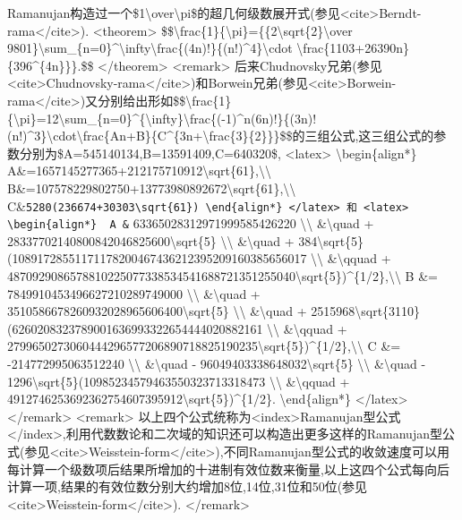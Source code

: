 \documentclass[
]{article}
\begin{document}
Ramanujan构造过一个\$1\textbackslash over\textbackslash pi\$的超几何级数展开式(参见\textless cite\textgreater Berndt-rama\textless/cite\textgreater).
\textless theorem\textgreater{}
\$\$\textbackslash frac\{1\}\{\textbackslash pi\}=\{\{2\textbackslash sqrt\{2\}\textbackslash over
9801\}\textbackslash sum\_\{n=0\}\^{}\textbackslash infty\textbackslash frac\{(4n)!\}\{(n!)\^{}4\}\textbackslash cdot
\textbackslash frac\{1103+26390n\}\{396\^{}\{4n\}\}\}.\$\$
\textless/theorem\textgreater{} \textless remark\textgreater{}
后来Chudnovsky兄弟(参见\textless cite\textgreater Chudnovsky-rama\textless/cite\textgreater)和Borwein兄弟(参见\textless cite\textgreater Borwein-rama\textless/cite\textgreater)又分别给出形如\$\$\textbackslash frac\{1\}\{\textbackslash pi\}=12\textbackslash sum\_\{n=0\}\^{}\{\textbackslash infty\}\textbackslash frac\{(-1)\^{}n(6n)!\}\{(3n)!(n!)\^{}3\}\textbackslash cdot\textbackslash frac\{An+B\}\{C\^{}\{3n+\textbackslash frac\{3\}\{2\}\}\}\$\$的三组公式,这三组公式的参数分别为\$A=545140134,B=13591409,C=640320\$,
\textless latex\textgreater{} \textbackslash begin\{align*\}
A\&=1657145277365+212175710912\textbackslash sqrt\{61\},\textbackslash\textbackslash{}
B\&=107578229802750+13773980892672\textbackslash sqrt\{61\},\textbackslash\textbackslash{}
C\&\texttt{5280(236674+30303\textbackslash{}sqrt\{61\})
\textbackslash{}end\{align*\}
\textless{}/latex\textgreater{}
和
\textless{}latex\textgreater{}
\textbackslash{}begin\{align*\}
\ A\ \&} 63365028312971999585426220 \textbackslash\textbackslash{}
\&\textbackslash quad +
28337702140800842046825600\textbackslash sqrt\{5\}
\textbackslash\textbackslash{} \&\textbackslash quad +
384\textbackslash sqrt\{5\}
(10891728551171178200467436212395209160385656017
\textbackslash\textbackslash{} \&\textbackslash qquad +
4870929086578810225077338534541688721351255040\textbackslash sqrt\{5\})\^{}\{1/2\},\textbackslash\textbackslash{}
B \&= 7849910453496627210289749000 \textbackslash\textbackslash{}
\&\textbackslash quad +
3510586678260932028965606400\textbackslash sqrt\{5\}
\textbackslash\textbackslash{} \&\textbackslash quad +
2515968\textbackslash sqrt\{3110\}(6260208323789001636993322654444020882161
\textbackslash\textbackslash{} \&\textbackslash qquad +
2799650273060444296577206890718825190235\textbackslash sqrt\{5\})\^{}\{1/2\},\textbackslash\textbackslash{}
C \&= -214772995063512240 \textbackslash\textbackslash{}
\&\textbackslash quad - 96049403338648032\textbackslash sqrt\{5\}
\textbackslash\textbackslash{} \&\textbackslash quad -
1296\textbackslash sqrt\{5\}(10985234579463550323713318473
\textbackslash\textbackslash{} \&\textbackslash qquad +
4912746253692362754607395912\textbackslash sqrt\{5\})\^{}\{1/2\}.
\textbackslash end\{align*\} \textless/latex\textgreater{}
\textless/remark\textgreater{} \textless remark\textgreater{}
以上四个公式统称为\textless index\textgreater Ramanujan型公式\textless/index\textgreater,利用代数数论和二次域的知识还可以构造出更多这样的Ramanujan型公式(参见\textless cite\textgreater Weisstein-form\textless/cite\textgreater),不同Ramanujan型公式的收敛速度可以用每计算一个级数项后结果所增加的十进制有效位数来衡量,以上这四个公式每向后计算一项,结果的有效位数分别大约增加8位,14位,31位和50位(参见\textless cite\textgreater Weisstein-form\textless/cite\textgreater).
\textless/remark\textgreater{}
\end{document}
